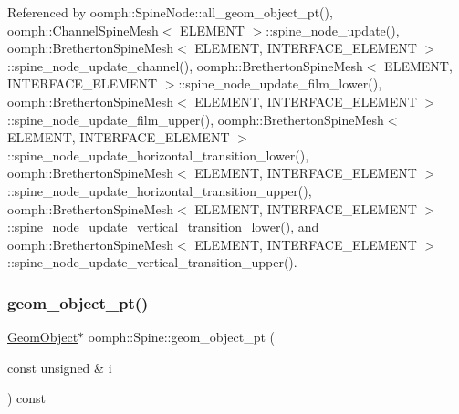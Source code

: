 Referenced by oomph\+::\+Spine\+Node\+::all\+\_\+geom\+\_\+object\+\_\+pt(), oomph\+::\+Channel\+Spine\+Mesh$<$ E\+L\+E\+M\+E\+N\+T $>$\+::spine\+\_\+node\+\_\+update(), oomph\+::\+Bretherton\+Spine\+Mesh$<$ E\+L\+E\+M\+E\+N\+T, I\+N\+T\+E\+R\+F\+A\+C\+E\+\_\+\+E\+L\+E\+M\+E\+N\+T $>$\+::spine\+\_\+node\+\_\+update\+\_\+channel(), oomph\+::\+Bretherton\+Spine\+Mesh$<$ E\+L\+E\+M\+E\+N\+T, I\+N\+T\+E\+R\+F\+A\+C\+E\+\_\+\+E\+L\+E\+M\+E\+N\+T $>$\+::spine\+\_\+node\+\_\+update\+\_\+film\+\_\+lower(), oomph\+::\+Bretherton\+Spine\+Mesh$<$ E\+L\+E\+M\+E\+N\+T, I\+N\+T\+E\+R\+F\+A\+C\+E\+\_\+\+E\+L\+E\+M\+E\+N\+T $>$\+::spine\+\_\+node\+\_\+update\+\_\+film\+\_\+upper(), oomph\+::\+Bretherton\+Spine\+Mesh$<$ E\+L\+E\+M\+E\+N\+T, I\+N\+T\+E\+R\+F\+A\+C\+E\+\_\+\+E\+L\+E\+M\+E\+N\+T $>$\+::spine\+\_\+node\+\_\+update\+\_\+horizontal\+\_\+transition\+\_\+lower(), oomph\+::\+Bretherton\+Spine\+Mesh$<$ E\+L\+E\+M\+E\+N\+T, I\+N\+T\+E\+R\+F\+A\+C\+E\+\_\+\+E\+L\+E\+M\+E\+N\+T $>$\+::spine\+\_\+node\+\_\+update\+\_\+horizontal\+\_\+transition\+\_\+upper(), oomph\+::\+Bretherton\+Spine\+Mesh$<$ E\+L\+E\+M\+E\+N\+T, I\+N\+T\+E\+R\+F\+A\+C\+E\+\_\+\+E\+L\+E\+M\+E\+N\+T $>$\+::spine\+\_\+node\+\_\+update\+\_\+vertical\+\_\+transition\+\_\+lower(), and oomph\+::\+Bretherton\+Spine\+Mesh$<$ E\+L\+E\+M\+E\+N\+T, I\+N\+T\+E\+R\+F\+A\+C\+E\+\_\+\+E\+L\+E\+M\+E\+N\+T $>$\+::spine\+\_\+node\+\_\+update\+\_\+vertical\+\_\+transition\+\_\+upper().

\mbox{\label{classoomph_1_1Spine_a1b0c82fb9f9f2fc7df286e516c818b4c}} 
\subsubsection{\texorpdfstring{geom\+\_\+object\+\_\+pt()}{geom\_object\_pt()}\hspace{0.1cm}{\footnotesize\ttfamily [2/2]}}
{\footnotesize\ttfamily \hyperlink{classoomph_1_1GeomObject}{Geom\+Object}$\ast$ oomph\+::\+Spine\+::geom\+\_\+object\+\_\+pt (\begin{DoxyParamCaption}\item[{const unsigned \&}]{i }\end{DoxyParamCaption}) const\hspace{0.3cm}{\ttfamily [inline]}}



